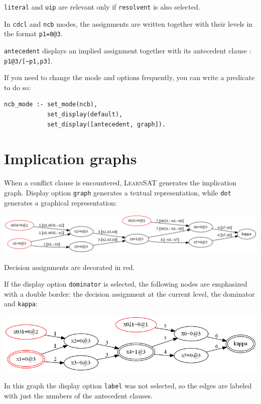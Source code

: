\documentclass[11pt]{article}
\newcommand*{\p}[1]{\textup{\texttt{#1}}}
\newcommand*{\ls}{\textsc{LearnSAT}}
\begin{document}
\p{literal} and \p{uip} are relevant only if \p{resolvent} is also
selected.

In \p{cdcl} and \p{ncb} modes, the assignments are written together with
their levels in the format \p{p1=0@3}.

\p{antecedent} displays an implied assignment together with its
antecedent clause : \verb+p1@3/[~p1,p3]+.

If you need to change the mode and options frequently, you can write a
predicate to do so:

\begin{verbatim}
ncb_mode :- set_mode(ncb),
            set_display(default),
            set_display([antecedent, graph]).
\end{verbatim}

\section{Implication graphs}\label{s.impl}

When a conflict clause is encountered, \ls{} generates the implication
graph. Display option \p{graph} generates a textual representation,
while \p{dot} generates a graphical representation:

\begin{center}
\includegraphics[keepaspectratio=true,width=.9\textwidth]{graph}
\end{center}

Decision assignments are decorated in red.

If the display option \p{dominator} is selected, the following nodes are
emphasized with a double border: the decision assignment at the current
level, the dominator and \p{kappa}:

\begin{center}
\includegraphics[keepaspectratio=true,width=.9\textwidth]{dom}
\end{center}

In this graph the display option \p{label} was not selected, so the
edges are labeled with just the numbers of the antecedent clauses.
\end{document}
